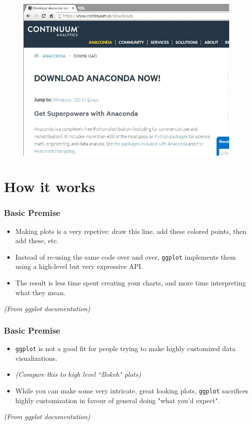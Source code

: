 \documentclass{beamer}
\begin{document}
\begin{frame}
	\begin{figure}
		\centering
		\includegraphics[width=1.1\linewidth]{setup1}
	\end{figure}
	
\end{frame}

\section{How it works}
\begin{frame}[fragile]
	\Large
	\frametitle{Basic Premise}
\vspace{-0.7cm}
	\begin{itemize}
		\item Making plots is a very repetive: draw this line, add these colored points, then add these, etc. 
		\item Instead of re-using the same code over and over, \texttt{ggplot} implements them using a high-level but very expressive API.
		\item The result is less time spent creating your charts, and more time interpreting what they mean.
	\end{itemize}
\textit{(From ggplot documentation)}	
\end{frame}

\begin{frame}[fragile]
	\Large
\frametitle{Basic Premise}
	\begin{itemize}
		\item \texttt{ggplot} is not a good fit for people trying to make highly customized data visualizations. 
		\item \textit{(Compare this to high level ``Bokeh" plots)}
		\item While you can make some very intricate, great looking plots, \texttt{ggplot} sacrifices highly customization in favour of general doing "what you'd expect".
	\end{itemize}
\textit{(From ggplot documentation)}	
\end{frame}
\end{document}
